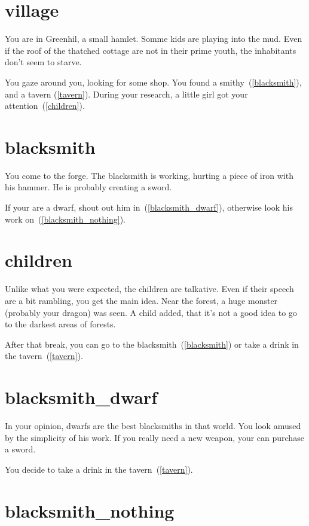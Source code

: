 
\section{village}

You are in Greenhil, a small hamlet. Somme kids are playing into the mud. Even
if the roof of the thatched cottage are not in their prime youth, the
inhabitants don't seem to starve.

You gaze around you, looking for some shop. You found a
smithy~(\ref{blacksmith}), and a tavern (\ref{tavern}). During your research, a
little girl got your attention~(\ref{children}).

\section{blacksmith}

You come to the forge. The blacksmith is working, hurting a piece of iron with
his hammer. He is probably creating a sword.

If your are a dwarf, shout out him in~(\ref{blacksmith_dwarf}), otherwise look his
work on~(\ref{blacksmith_nothing}).

\section{children}

Unlike what you were expected, the children are talkative. Even if their speech
are a bit rambling, you get the main idea. Near the forest, a huge monster
(probably your dragon) was seen. A child added, that it's not a good idea to go
to the darkest areas of forests.

After that break, you can go to the blacksmith~(\ref{blacksmith}) or take a drink in
the tavern~(\ref{tavern}).

\section{blacksmith_dwarf}

In your opinion, dwarfs are the best blacksmiths in that world. You look amused
by the simplicity of his work. If you really need a new weapon, your can
purchase a sword.

You decide to take a drink in the tavern~(\ref{tavern}).

\section{blacksmith_nothing}

